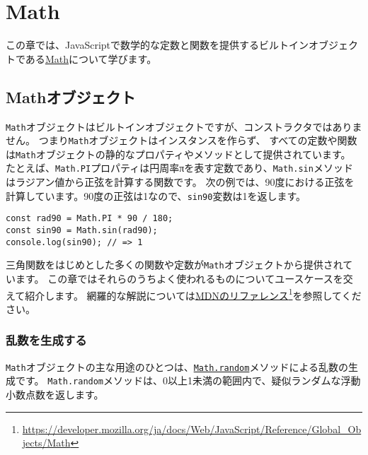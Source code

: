 \hypertarget{math}{%
\chapter{Math}\label{math}}
\thispagestyle{frontheadings}

この章では、JavaScriptで数学的な定数と関数を提供するビルトインオブジェクトである\href{https://developer.mozilla.org/ja/docs/Web/JavaScript/Reference/Global_Objects/Math}{Math}について学びます。

\hypertarget{math-object}{%
\section{Mathオブジェクト}\label{math-object}}

\texttt{Math}オブジェクトはビルトインオブジェクトですが、コンストラクタではありません。
つまり\texttt{Math}オブジェクトはインスタンスを作らず、
すべての定数や関数は\texttt{Math}オブジェクトの静的なプロパティやメソッドとして提供されています。
たとえば、\texttt{Math.PI}プロパティは円周率πを表す定数であり、\texttt{Math.sin}メソッドはラジアン値から正弦を計算する関数です。
次の例では、90度における正弦を計算しています。90度の正弦は1なので、\texttt{sin90}変数は1を返します。

\begin{lstlisting}
const rad90 = Math.PI * 90 / 180;
const sin90 = Math.sin(rad90);
console.log(sin90); // => 1
\end{lstlisting}

三角関数をはじめとした多くの関数や定数が\texttt{Math}オブジェクトから提供されています。
この章ではそれらのうちよく使われるものについてユースケースを交えて紹介します。
網羅的な解説については\href{https://developer.mozilla.org/ja/docs/Web/JavaScript/Reference/Global_Objects/Math}{MDNのリファレンス}\footnote{\url{https://developer.mozilla.org/ja/docs/Web/JavaScript/Reference/Global_Objects/Math}}を参照してください。

\hypertarget{create-random-number}{%
\subsection{乱数を生成する}\label{create-random-number}}

\texttt{Math}オブジェクトの主な用途のひとつは、\href{https://developer.mozilla.org/ja/docs/Web/JavaScript/Reference/Global_Objects/Math/random}{\texttt{Math.random}}メソッドによる乱数の生成です。
\texttt{Math.random}メソッドは、0以上1未満の範囲内で、疑似ランダムな浮動小数点数を返します。

